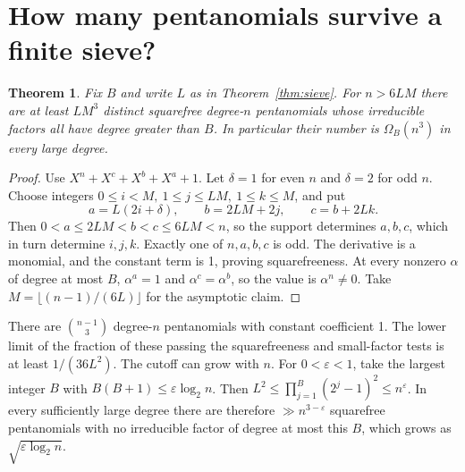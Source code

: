 \documentclass[11pt]{article}
\newtheorem{theorem}{Theorem}
\begin{document}
\section{How many pentanomials survive a finite sieve?}
\begin{theorem}\label{thm:many}
Fix \(B\) and write \(L\) as in Theorem~\ref{thm:sieve}.
For \(n>6LM\) there are at least \(LM^3\) distinct squarefree degree-\(n\)
pentanomials whose irreducible factors all have degree greater than \(B\).
In particular their number is \(\Omega_B(n^3)\) in every large degree.
\end{theorem}
\begin{proof}
Use \(X^n+X^c+X^b+X^a+1\). Let \(\delta=1\) for even \(n\) and
\(\delta=2\) for odd \(n\). Choose integers \(0\le i<M,\ 1\le j\le LM,\
1\le k\le M\), and put
\[
  a=L(2i+\delta),\qquad b=2LM+2j,\qquad c=b+2Lk.
\]
Then \(0<a\le 2LM<b<c\le 6LM<n\), so the support determines \(a,b,c\),
which in turn determine \(i,j,k\). Exactly one of \(n,a,b,c\) is odd.
The derivative is a monomial, and the constant term is 1, proving
squarefreeness. At every nonzero \(\alpha\) of degree at most \(B\),
\(\alpha^a=1\) and \(\alpha^c=\alpha^b\), so the value is \(\alpha^n\ne0\).
Take \(M=\lfloor(n-1)/(6L)\rfloor\) for the asymptotic claim.
\end{proof}
There are \(\binom{n-1}{3}\) degree-\(n\) pentanomials with constant
coefficient 1. The lower limit of the fraction of these passing the
squarefreeness and small-factor tests is at least \(1/(36L^2)\).
The cutoff can grow with \(n\). For \(0<\varepsilon<1\), take the largest
integer \(B\) with \(B(B+1)\le\varepsilon\log_2 n\). Then
\(L^2\le\prod_{j=1}^B(2^j-1)^2\le n^\varepsilon\).
In every sufficiently large degree there are therefore
\(\gg n^{3-\varepsilon}\) squarefree pentanomials with no irreducible
factor of degree at most this \(B\), which grows as
\(\sqrt{\varepsilon\log_2 n}\).
\end{document}
